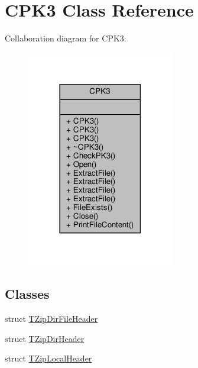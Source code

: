 \hypertarget{classCPK3}{}\section{C\+P\+K3 Class Reference}
\label{classCPK3}


Collaboration diagram for C\+P\+K3\+:
\nopagebreak
\begin{figure}[H]
\begin{center}
\leavevmode
\includegraphics[width=182pt]{d7/d18/classCPK3__coll__graph}
\end{center}
\end{figure}
\subsection*{Classes}
\begin{DoxyCompactItemize}
\item 
struct \hyperlink{structCPK3_1_1TZipDirFileHeader}{T\+Zip\+Dir\+File\+Header}
\item 
struct \hyperlink{structCPK3_1_1TZipDirHeader}{T\+Zip\+Dir\+Header}
\item 
struct \hyperlink{structCPK3_1_1TZipLocalHeader}{T\+Zip\+Local\+Header}
\end{DoxyCompactItemize}
